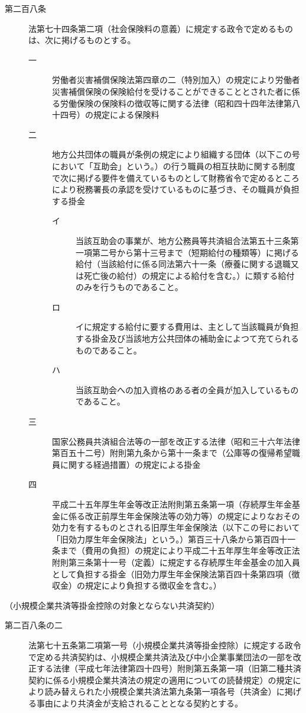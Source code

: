 \documentclass[twocolumn,a4j,10pt]{ltjtarticle}
\begin{document}
\begin{description}
\item[第二百八条]法第七十四条第二項（社会保険料の意義）に規定する政令で定めるものは、次に掲げるものとする。
\begin{description}
\item[一]労働者災害補償保険法第四章の二（特別加入）の規定により労働者災害補償保険の保険給付を受けることができることとされた者に係る労働保険の保険料の徴収等に関する法律（昭和四十四年法律第八十四号）の規定による保険料
\item[二]地方公共団体の職員が条例の規定により組織する団体（以下この号において「互助会」という。）の行う職員の相互扶助に関する制度で次に掲げる要件を備えているものとして財務省令で定めるところにより税務署長の承認を受けているものに基づき、その職員が負担する掛金
\begin{description}
\item[イ]当該互助会の事業が、地方公務員等共済組合法第五十三条第一項第二号から第十三号まで（短期給付の種類等）に掲げる給付（当該給付に係る同法第六十一条（療養に関する退職又は死亡後の給付）の規定による給付を含む。）に類する給付のみを行うものであること。
\item[ロ]イに規定する給付に要する費用は、主として当該職員が負担する掛金及び当該地方公共団体の補助金によつて充てられるものであること。
\item[ハ]当該互助会への加入資格のある者の全員が加入しているものであること。
\end{description}
\item[三]国家公務員共済組合法等の一部を改正する法律（昭和三十六年法律第百五十二号）附則第九条から第十一条まで（公庫等の復帰希望職員に関する経過措置）の規定による掛金
\item[四]平成二十五年厚生年金等改正法附則第五条第一項（存続厚生年金基金に係る改正前厚生年金保険法等の効力等）の規定によりなおその効力を有するものとされる旧厚生年金保険法（以下この号において「旧効力厚生年金保険法」という。）第百三十八条から第百四十一条まで（費用の負担）の規定により平成二十五年厚生年金等改正法附則第三条第十一号（定義）に規定する存続厚生年金基金の加入員として負担する掛金（旧効力厚生年金保険法第百四十条第四項（徴収金）の規定により負担する徴収金を含む。）
\end{description}
\end{description}
\noindent\hspace{10pt}（小規模企業共済等掛金控除の対象とならない共済契約）
\begin{description}
\item[第二百八条の二]法第七十五条第二項第一号（小規模企業共済等掛金控除）に規定する政令で定める共済契約は、小規模企業共済法及び中小企業事業団法の一部を改正する法律（平成七年法律第四十四号）附則第五条第一項（旧第二種共済契約に係る小規模企業共済法の規定の適用についての読替規定）の規定により読み替えられた小規模企業共済法第九条第一項各号（共済金）に掲げる事由により共済金が支給されることとなる契約とする。
\end{description}
\end{document}
